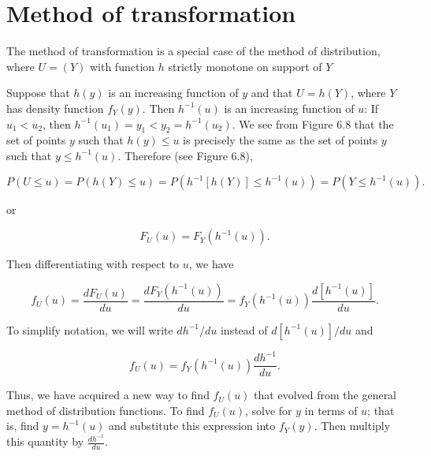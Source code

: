 \documentclass{report}
\begin{document}
\section{Method of transformation}
The method of transformation is a special case of the method of distribution, where 
$U = (Y)$ with function $h$ strictly monotone on support of $Y$

Suppose that $h(y)$ is an increasing function of $y$ and that $U = h(Y)$, where $Y$ has density function $f_Y(y)$. Then $h^{-1}(u)$ is an increasing function of $u$: If $u_1 < u_2$, then $h^{-1}(u_1) = y_1 < y_2 = h^{-1}(u_2)$. We see from Figure 6.8 that the set of points $y$ such that $h(y) \leq u$ is precisely the same as the set of points $y$ such that $y \leq h^{-1}(u)$. Therefore (see Figure 6.8),

\[
P(U \leq u) = P(h(Y) \leq u) = P(h^{-1}[h(Y)] \leq h^{-1}(u)) = P(Y \leq h^{-1}(u)).
\]

or

\[
F_U(u) = F_Y(h^{-1}(u)).
\]

Then differentiating with respect to $u$, we have

\[
f_U(u) = \frac{dF_U(u)}{du} = \frac{dF_Y(h^{-1}(u))}{du} = f_Y(h^{-1}(u)) \frac{d[h^{-1}(u)]}{du}.
\]

To simplify notation, we will write $dh^{-1}/du$ instead of $d[h^{-1}(u)]/du$ and

\[
f_U(u) = f_Y(h^{-1}(u)) \frac{dh^{-1}}{du}.
\]

Thus, we have acquired a new way to find $f_U(u)$ that evolved from the general method of distribution functions. To find $f_U(u)$, solve for $y$ in terms of $u$; that is, find $y = h^{-1}(u)$ and substitute this expression into $f_Y(y)$. Then multiply this quantity by $\frac{dh^{-1}}{du}$. 



\end{document}
